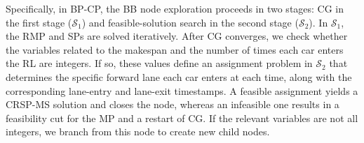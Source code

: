 \documentclass[12pt]{article}
\begin{document}
Specifically, in BP-CP, the BB node exploration proceeds in two stages: CG in the first stage ($\mathcal{S}_1$) and feasible-solution search in the second stage ($\mathcal{S}_2$). In $\mathcal{S}_1$, the RMP and SPs are solved iteratively. After CG converges, we check whether the variables related to the makespan and the number of times each car enters the RL are integers. If so, these values define an assignment problem in $\mathcal{S}_2$ that determines the specific forward lane each car enters at each time, along with the corresponding lane-entry and lane-exit timestamps. A feasible assignment yields a CRSP-MS solution and closes the node, whereas an infeasible one results in a feasibility cut for the MP and a restart of CG. If the relevant variables are not all integers, we branch from this node to create new child nodes.



\end{document}
